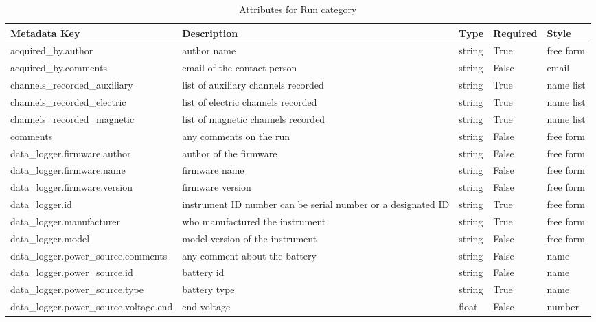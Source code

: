 \documentclass{article}
\begin{document}
\begin{table}[h!]
    \caption[Attributes for Run]{Attributes for Run category}
    \begin{tabular}{|l|p{2.55in}|l|l|p{.95in}|}
        \hline
       \textbf{Metadata Key} & \textbf{Description} & \textbf{Type} & \textbf{Required} & \textbf{Style}\\ \hline acquired\_by.author & author name & string & True & free form  \\ \hline
       acquired\_by.comments & email of the contact person & string & False & email  \\ \hline
       channels\_recorded\_auxiliary & list of auxiliary channels recorded & string & True & name list  \\ \hline
       channels\_recorded\_electric & list of electric channels recorded & string & True & name list  \\ \hline
       channels\_recorded\_magnetic & list of magnetic channels recorded & string & True & name list  \\ \hline
       comments & any comments on the run & string & False & free form  \\ \hline
       data\_logger.firmware.author & author of the firmware & string & False & free form  \\ \hline
       data\_logger.firmware.name & firmware name & string & False & free form  \\ \hline
       data\_logger.firmware.version & firmware version & string & False & free form  \\ \hline
       data\_logger.id & instrument ID number can be serial number or a designated ID & string & True & free form  \\ \hline
       data\_logger.manufacturer & who manufactured the instrument & string & True & free form  \\ \hline
       data\_logger.model & model version of the instrument & string & False & free form  \\ \hline
       data\_logger.power\_source.comments & any comment about the battery & string & False & name  \\ \hline
       data\_logger.power\_source.id & battery id & string & False & name  \\ \hline
       data\_logger.power\_source.type & battery type & string & True & name  \\ \hline
       data\_logger.power\_source.voltage.end & end voltage & float & False & number  \\ \hline

\end{tabular}
\end{table}
\end{document}
